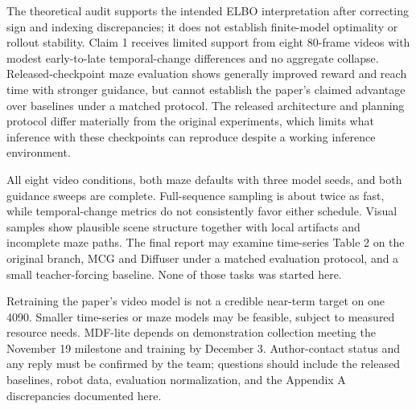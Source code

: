 The theoretical audit supports the intended ELBO interpretation after correcting sign and indexing discrepancies; it does not establish finite-model optimality or rollout stability. Claim 1 receives limited support from eight 80-frame videos with modest early-to-late temporal-change differences and no aggregate collapse. Released-checkpoint maze evaluation shows generally improved reward and reach time with stronger guidance, but cannot establish the paper's claimed advantage over baselines under a matched protocol. The released architecture and planning protocol differ materially from the original experiments, which limits what inference with these checkpoints can reproduce despite a working inference environment.

All eight video conditions, both maze defaults with three model seeds, and both guidance sweeps are complete. Full-sequence sampling is about twice as fast, while temporal-change metrics do not consistently favor either schedule. Visual samples show plausible scene structure together with local artifacts and incomplete maze paths. The final report may examine time-series Table 2 on the original branch, MCG and Diffuser under a matched evaluation protocol, and a small teacher-forcing baseline. None of those tasks was started here.

Retraining the paper's video model is not a credible near-term target on one 4090. Smaller time-series or maze models may be feasible, subject to measured resource needs. MDF-lite depends on demonstration collection meeting the November 19 milestone and training by December 3. Author-contact status and any reply must be confirmed by the team; questions should include the released baselines, robot data, evaluation normalization, and the Appendix A discrepancies documented here.
